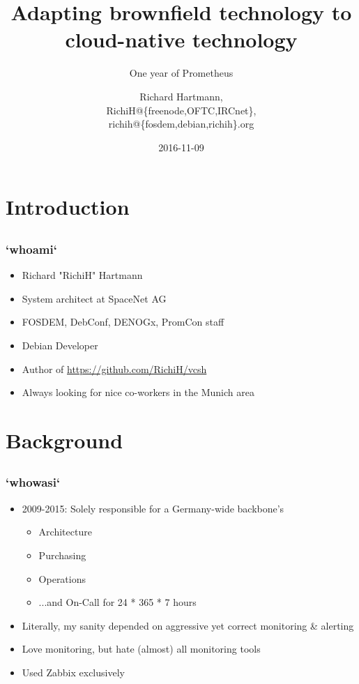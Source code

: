 \documentclass[t]{beamer}
\title{Adapting brownfield technology to cloud-native technology}
\subtitle{One year of Prometheus}
\author{Richard Hartmann,\\
RichiH@\{freenode,OFTC,IRCnet\},\\
richih@\{fosdem,debian,richih\}.org}
\date{2016-11-09}
\begin{document}
\setcounter{tocdepth}{1}

\begin{frame}
	\titlepage
\end{frame}


\section{Introduction}

\subsection{}

\begin{frame}
	\frametitle{`whoami`}
	\begin{itemize}
		\item Richard "RichiH" Hartmann
		\item System architect at SpaceNet AG
		\item FOSDEM, DebConf, DENOGx, PromCon staff
		\item Debian Developer
		\item Author of \url{https://github.com/RichiH/vcsh}
		\item Always looking for nice co-workers in the Munich area
	\end{itemize}
\end{frame}


\section{Background}

\subsection{}

\begin{frame}
	\frametitle{`whowasi`}
	\begin{itemize}
		\item 2009-2015: Solely responsible for a Germany-wide backbone's
		\begin{itemize}
			\item Architecture
			\item Purchasing
			\item Operations
			\item ...and On-Call for 24 * 365 * 7 hours
		\end{itemize}
		\item Literally, my sanity depended on aggressive yet correct monitoring \& alerting
		\item Love monitoring, but hate (almost) all monitoring tools
		\item Used Zabbix exclusively
	\end{itemize}
\end{frame}
\end{document}
